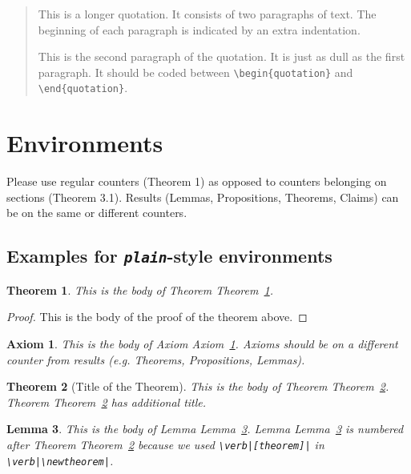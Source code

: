 \documentclass[qe,nameyear,final]{econsocart}
\newtheorem{theorem}{Theorem}[section]
\newtheorem{lemma}[theorem]{Lemma}
\newtheorem{axiom}{Axiom}[section]
\begin{document}
\begin{quotation}
This is a longer quotation.  It consists of two paragraphs
of text.  The beginning of each paragraph is indicated
by an extra indentation.

This is the second paragraph of the quotation.  It is just
as dull as the first paragraph. It should be coded between \verb|\begin{quotation}| and \verb|\end{quotation}|.
\end{quotation}
\section{Environments}

Please use regular counters (Theorem 1) as opposed to counters belonging on sections (Theorem 3.1). Results (Lemmas, Propositions, Theorems, Claims) can be on the same or different counters.

\subsection{Examples for \textit{\texttt{plain}}-style environments}

\begin{theorem}\label{th1}This is the body of Theorem Theorem~\ref{th1}.

\end{theorem}\begin{proof}This is the body of the proof of the theorem above.

\end{proof}

\begin{axiom}\label{ax1}This is the body of Axiom Axiom~\ref{ax1}. Axioms should be on a different counter from results (e.g. Theorems, Propositions, Lemmas).

\end{axiom}\begin{theorem}[Title of the Theorem]\label{th2}This is the body of Theorem Theorem~\ref{th2}. Theorem Theorem~\ref{th2} has additional title.

\end{theorem}\begin{lemma}\label{le1}This is the body of Lemma Lemma~\ref{le1}. Lemma Lemma~\ref{le1} is numbered after
Theorem Theorem~\ref{th2} because we used \texttt{{\textbackslash}verb|[theorem]|} in \texttt{{\textbackslash}verb|{\textbackslash}newtheorem|}.

\end{lemma}
\end{document}
